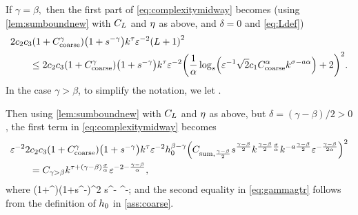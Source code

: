 If $\gamma=\beta,$ then the first part of \eqref{eq:complexitymidway} becomes (using \cref{lem:sumboundnew} with $C_{L}$ and $\eta$ as above, and $\delta = 0$ and \cref{eq:Ldef})
\begin{align}
  &2 \ct\cth \mleft(1+\Ccoarse^{\gamma}\mright) \mleft(1+s^{-\gamma}\mright)k^{\tau}\eps^{-2}\mleft(L+1\mright)^2\nonumber\\
  &\quad\quad\leq 2 \ct\cth \mleft(1+\Ccoarse^{\gamma}\mright) \mleft(1+s^{-\gamma}\mright)k^{\tau}\eps^{-2}\mleft(\frac1\alpha \log_s \mleft(\eps^{-1}\sqrt{2} \co \Ccoarse^\alpha k^{\sigma-a\alpha}\mright)+2\mright)^2.
\label{eq:gammaequal}
\end{align}
In the case $\gamma > \beta$, to simplify the notation, we let
\beqs
\csumdelta \de {}.
\eeqs

Then using \cref{lem:sumboundnew} with $C_{L}$ and $\eta$ as above, but $\delta = (\gamma-\beta)/2 > 0$, the first term in \eqref{eq:complexitymidway} becomes
\begin{align}
&  \eps^{-2}2\ct\cth\mleft(1+\Ccoarse^{\gamma}\mright) \mleft(1+s^{-\gamma}\mright) k^\tau\eps^{-2} \hz^{\beta-\gamma}\mleft(\csumgammambetat s^{\frac{\gamma-\beta}2} k^{\frac{\gamma-\beta}2\frac\sigma\alpha} k^{-a\frac{\gamma-\beta}2} \eps^{-\frac{\gamma-\beta}{2\alpha}}\mright)^2\nonumber\\
  &\quad\quad= \Cgammagtrbeta k^{\tau + \mleft(\gamma-\beta\mright)\frac\sigma\alpha} \eps^{-2-\frac{\gamma-\beta}{\alpha}},\label{eq:gammagtr}
\end{align}
where
\beqs
\Cgammagtrbeta {}\ct\cth\mleft(1+\Ccoarse^{\gamma}\mright)\mleft(1+s^{-\gamma}\mright)\csumgammambetat^2 s^{\gamma-\beta} \Ccoarse^{\beta-\gamma};
\eeqs
and the second equality in \cref{eq:gammagtr} follows from the definition of $h_{0}$ in \cref{ass:coarse}.

